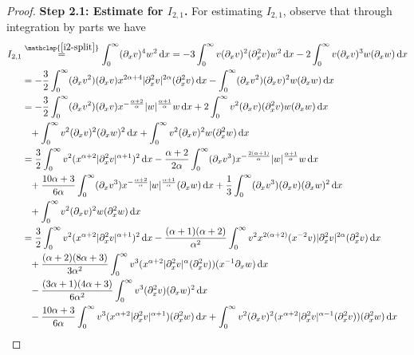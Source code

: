 \documentclass[reqno,12pt]{amsart}
\renewcommand{\d}{\ensuremath{\mathrm{d}}}
\renewcommand{\d}{\ensuremath{{\rm d}}}
\numberwithin{equation}{section}
\begin{document}
\begin{proof}
\noindent\textbf{Step 2.1: Estimate for $I_{2,1}$. }
For estimating $I_{2,1}$, observe that through integration by parts we have 
%
\begin{align}
I_{2,1} &\stackrel{\mathclap{\eqref{i2-split}}}{=} \int_0^\infty (\partial_x v)^4 w^2 \, \d x = - 3 \int_0^\infty v (\partial_x v)^2 (\partial_x^2 v) w^2 \, \d x - 2 \int_0^\infty v (\partial_x v)^3 w (\partial_x w) \, \d x \nonumber \\
&= -\frac 3 2 \int_0^\infty (\partial_x v^2) (\partial_x v) x^{2 \alpha + 4} |\partial_x^2 v|^{2\alpha} (\partial_x^2 v) \, \d x - \int_0^\infty (\partial_x v^2) (\partial_x v)^2 w (\partial_x w) \, \d x \nonumber \\
&= - \frac 3 2 \int_0^\infty (\partial_x v^2) (\partial_x v) x^{-\frac{\alpha+2}{\alpha}} |w|^{\frac{\alpha+1}{\alpha}} w \, \d x + 2 \int_0^\infty v^2 (\partial_x v) (\partial_x^2 v) w (\partial_x w) \, \d x \nonumber \\
&\phantom{=} + \int_0^\infty v^2 (\partial_x v)^2 (\partial_x w)^2 \, \d x + \int_0^\infty v^2 (\partial_x v)^2 w (\partial_x^2 w) \, \d x \nonumber \\
&= \frac 3 2 \int_0^\infty v^2 (x^{\alpha+2} |\partial_x^2 v|^{\alpha+1})^2 \, \d x - \frac{\alpha+2}{2\alpha} \int_0^\infty (\partial_x v^3) x^{- \frac{2 (\alpha+1)}{\alpha}} |w|^{\frac{\alpha+1}{\alpha}} w \, \d x \nonumber \\
&\phantom{=} + \frac{10\alpha+3}{6 \alpha} \int_0^\infty (\partial_x v^3) x^{-\frac{\alpha+2}{\alpha}} |w|^{\frac{\alpha+1}{\alpha}} (\partial_x w) \, \d x + \frac 1 3 \int_0^\infty (\partial_x v^3) (\partial_x v) (\partial_x w)^2 \, \d x \nonumber \\
&\phantom{=} + \int_0^\infty v^2 (\partial_x v)^2 w (\partial_x^2 w) \, \d x \nonumber \\
&= \frac 3 2 \int_0^\infty v^2 (x^{\alpha+2} |\partial_x^2 v|^{\alpha+1})^2 \, \d x - \frac{(\alpha+1)(\alpha+2)}{\alpha^2} \int_0^\infty v^2 x^{2(\alpha+2)} (x^{-2} v) |\partial_x^2 v|^{2\alpha} (\partial_x^2 v) \, \d x \nonumber \\
&\phantom{=} + \frac{(\alpha+2)(8\alpha+3)}{3\alpha^2} \int_0^\infty v^3 (x^{\alpha+2}|\partial_x^2 v|^\alpha (\partial_x^2 v)) (x^{-1} \partial_x w) \, \d x \nonumber\\
&\phantom{=} - \frac{(3\alpha+1)(4\alpha+3)}{6\alpha^2} \int_0^\infty v^3 (\partial_x^2 v) (\partial_x w)^2 \, \d x \nonumber \\
&\phantom{=} - \frac{10\alpha+3}{6\alpha} \int_0^\infty v^3 (x^{\alpha+2} |\partial_x^2 v|^{\alpha+1}) (\partial_x^2 w) \, \d x + \int_0^\infty v^2 (\partial_x v)^2 (x^{\alpha+2}|\partial_x^2 v|^{\alpha-1} (\partial_x^2 v)) (\partial_x^2 w) \, \d x \nonumber \\

\end{align}
\end{proof}
\end{document}
